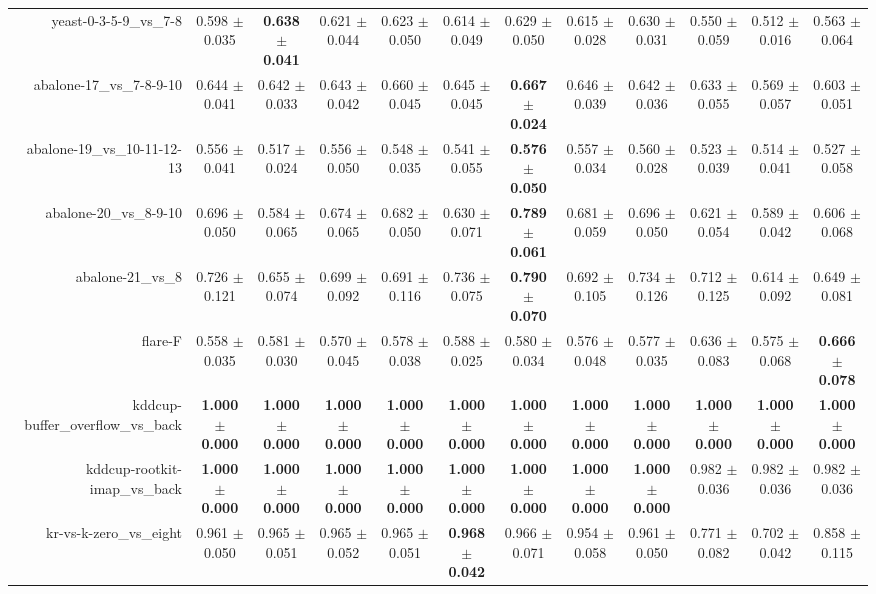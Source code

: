\begin{table}[!ht]
{\begin{tabular}{r c c c c c c c c c c c}
yeast-0-3-5-9\_vs\_7-8 & 0.598 $\pm$ 0.035 & \textbf{0.638 $\pm$ 0.041} & 0.621 $\pm$ 0.044 & 0.623 $\pm$ 0.050 & 0.614 $\pm$ 0.049 & 0.629 $\pm$ 0.050 & 0.615 $\pm$ 0.028 & 0.630 $\pm$ 0.031 & 0.550 $\pm$ 0.059 & 0.512 $\pm$ 0.016 & 0.563 $\pm$ 0.064 \\
abalone-17\_vs\_7-8-9-10 & 0.644 $\pm$ 0.041 & 0.642 $\pm$ 0.033 & 0.643 $\pm$ 0.042 & 0.660 $\pm$ 0.045 & 0.645 $\pm$ 0.045 & \textbf{0.667 $\pm$ 0.024} & 0.646 $\pm$ 0.039 & 0.642 $\pm$ 0.036 & 0.633 $\pm$ 0.055 & 0.569 $\pm$ 0.057 & 0.603 $\pm$ 0.051 \\
abalone-19\_vs\_10-11-12-13 & 0.556 $\pm$ 0.041 & 0.517 $\pm$ 0.024 & 0.556 $\pm$ 0.050 & 0.548 $\pm$ 0.035 & 0.541 $\pm$ 0.055 & \textbf{0.576 $\pm$ 0.050} & 0.557 $\pm$ 0.034 & 0.560 $\pm$ 0.028 & 0.523 $\pm$ 0.039 & 0.514 $\pm$ 0.041 & 0.527 $\pm$ 0.058 \\
abalone-20\_vs\_8-9-10 & 0.696 $\pm$ 0.050 & 0.584 $\pm$ 0.065 & 0.674 $\pm$ 0.065 & 0.682 $\pm$ 0.050 & 0.630 $\pm$ 0.071 & \textbf{0.789 $\pm$ 0.061} & 0.681 $\pm$ 0.059 & 0.696 $\pm$ 0.050 & 0.621 $\pm$ 0.054 & 0.589 $\pm$ 0.042 & 0.606 $\pm$ 0.068 \\
abalone-21\_vs\_8 & 0.726 $\pm$ 0.121 & 0.655 $\pm$ 0.074 & 0.699 $\pm$ 0.092 & 0.691 $\pm$ 0.116 & 0.736 $\pm$ 0.075 & \textbf{0.790 $\pm$ 0.070} & 0.692 $\pm$ 0.105 & 0.734 $\pm$ 0.126 & 0.712 $\pm$ 0.125 & 0.614 $\pm$ 0.092 & 0.649 $\pm$ 0.081 \\
flare-F & 0.558 $\pm$ 0.035 & 0.581 $\pm$ 0.030 & 0.570 $\pm$ 0.045 & 0.578 $\pm$ 0.038 & 0.588 $\pm$ 0.025 & 0.580 $\pm$ 0.034 & 0.576 $\pm$ 0.048 & 0.577 $\pm$ 0.035 & 0.636 $\pm$ 0.083 & 0.575 $\pm$ 0.068 & \textbf{0.666 $\pm$ 0.078} \\
kddcup-buffer\_overflow\_vs\_back & \textbf{1.000 $\pm$ 0.000} & \textbf{1.000 $\pm$ 0.000} & \textbf{1.000 $\pm$ 0.000} & \textbf{1.000 $\pm$ 0.000} & \textbf{1.000 $\pm$ 0.000} & \textbf{1.000 $\pm$ 0.000} & \textbf{1.000 $\pm$ 0.000} & \textbf{1.000 $\pm$ 0.000} & \textbf{1.000 $\pm$ 0.000} & \textbf{1.000 $\pm$ 0.000} & \textbf{1.000 $\pm$ 0.000} \\
kddcup-rootkit-imap\_vs\_back & \textbf{1.000 $\pm$ 0.000} & \textbf{1.000 $\pm$ 0.000} & \textbf{1.000 $\pm$ 0.000} & \textbf{1.000 $\pm$ 0.000} & \textbf{1.000 $\pm$ 0.000} & \textbf{1.000 $\pm$ 0.000} & \textbf{1.000 $\pm$ 0.000} & \textbf{1.000 $\pm$ 0.000} & 0.982 $\pm$ 0.036 & 0.982 $\pm$ 0.036 & 0.982 $\pm$ 0.036 \\
kr-vs-k-zero\_vs\_eight & 0.961 $\pm$ 0.050 & 0.965 $\pm$ 0.051 & 0.965 $\pm$ 0.052 & 0.965 $\pm$ 0.051 & \textbf{0.968 $\pm$ 0.042} & 0.966 $\pm$ 0.071 & 0.954 $\pm$ 0.058 & 0.961 $\pm$ 0.050 & 0.771 $\pm$ 0.082 & 0.702 $\pm$ 0.042 & 0.858 $\pm$ 0.115 \\

\end{tabular}}
\end{table}
